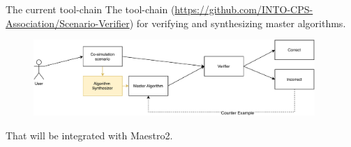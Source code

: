 \documentclass{beamer}
\begin{document}
\begin{frame}{The current tool-chain}
    The tool-chain (\url{https://github.com/INTO-CPS-Association/Scenario-Verifier}) for verifying and synthesizing master algorithms.
    \begin{figure}    
        \includegraphics[width=0.95\textwidth]{images/usecase-synth.pdf}
    \end{figure}
    That will be integrated with Maestro2.
\end{frame}
\end{document}
